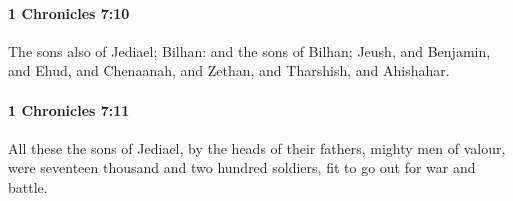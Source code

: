 		\paragraph{1 Chronicles 7:10} %
			\label{1CHRONICLES-7-10}

			The sons also of Jediael; Bilhan: and the sons of Bilhan; Jeush, and Benjamin, and Ehud, and Chenaanah, and Zethan, and Tharshish, and Ahishahar.


		\paragraph{1 Chronicles 7:11} %
			\label{1CHRONICLES-7-11}

			All these the sons of Jediael, by the heads of their fathers, mighty men of valour, were seventeen thousand and two hundred soldiers, fit to go out for war and battle.


